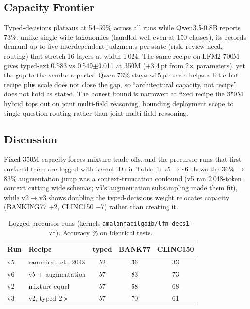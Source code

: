 \subsection{Capacity Frontier}
Typed-decisions plateaus at 54--59\% across all runs while Qwen3.5-0.8B
reports 73\%: unlike single wide taxonomies (handled well even at 150
classes), its records demand up to five interdependent judgments per state
(risk, review need, routing) that stretch 16 layers at width 1\,024. The same
recipe on LFM2-700M gives typed-ext 0.583 vs 0.549$\pm$0.011 at 350M
($+$3.4\,pt from 2$\times$ parameters), yet the gap to the vendor-reported
Qwen 73\% stays $\sim$15\,pt: scale helps a little but recipe plus scale does
not close the gap, so ``architectural capacity, not recipe'' does not hold as
stated. The honest bound is narrower: at fixed recipe the 350M hybrid tops
out on joint multi-field reasoning, bounding deployment scope to
single-question routing rather than joint multi-field reasoning.

\subsection{Discussion}
Fixed 350M capacity forces mixture trade-offs, and the precursor runs that
first surfaced them are logged with kernel IDs in Table~\ref{tab:precursors}:
v5$\to$v6 shows the 36\%\,$\to$\,83\% augmentation jump was a
context-truncation confound (v5 ran 2\,048-token context cutting wide schemas;
v6's augmentation subsampling made them fit), while v2$\to$v3 shows doubling
the typed-decisions weight relocates capacity (BANKING77 +2, CLINC150 $-$7)
rather than creating it.

\begin{table}[htbp]
\caption{Logged precursor runs (kernels \texttt{amalanfadilgaib/lfm-decs1-v*}).
Accuracy \% on identical tests.}
\label{tab:precursors}
\begin{center}
\setlength{\tabcolsep}{4pt}
\begin{small}
\begin{tabular}{llccc}
\toprule
Run & Recipe & typed & BANK77 & CLINC150 \\
\midrule
v5 & canonical, ctx 2048 & 52 & 36 & 33 \\
v6 & v5 + augmentation & 57 & 83 & 73 \\
v2 & mixture equal & 57 & 68 & 68 \\
v3 & v2, typed $2\times$ & 57 & 70 & 61 \\
\bottomrule
\end{tabular}
\end{small}
\end{center}
\end{table}

